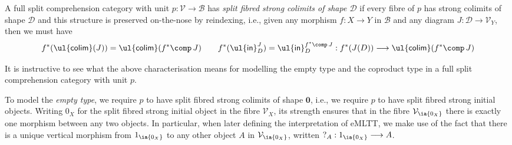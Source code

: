 \begin{definition} 
\label{def:strongsplitfibredcolims}
A full split comprehension category with unit $p : \mathcal{V} \longrightarrow \mathcal{B}$ has \emph{split fibred strong colimits of shape $\mathcal{D}$} if every fibre of $p$ has strong colimits of shape $\mathcal{D}$ and this structure is preserved on-the-nose by reindexing, i.e., given any morphism $f : X \longrightarrow Y$ in $\mathcal{B}$ and any diagram $J : \mathcal{D} \longrightarrow \mathcal{V}_Y$, then we must have 
\[
f^*(\mathsf{\ul{colim}}(J)) = \mathsf{\ul{colim}}(f^* \comp\, J)
\qquad
f^*(\mathsf{\ul{in}}^{J}_D) =  \mathsf{\ul{in}}^{f^* \comp\, J}_D: f^*(J(D)) \longrightarrow \mathsf{\ul{colim}}(f^* \comp\, J)
\]
\end{definition}

It is instructive to see what the above characterisation means for modelling the empty type and the coproduct type in a full split comprehension category with unit $p$.

To model the \emph{empty type}, we require $p$ to have split fibred strong colimits of shape $\mathbf{0}$, i.e., we require $p$ to have split fibred strong initial objects. 
Writing $0_X$ for the split fibred strong initial object in the fibre $\mathcal{V}_X$, its strength ensures that in the fibre $\mathcal{V}_{\ia {0_X}}$ there is exactly one morphism between any two objects. In particular, when later defining the interpretation of eMLTT, we make use of the fact that there is a unique vertical morphism from $1_{\ia {0_X}}$ to any other object $A$ in $\mathcal{V}_{\ia {0_X}}$, written ${?_A : 1_{\ia {0_X}} \longrightarrow A}$.

